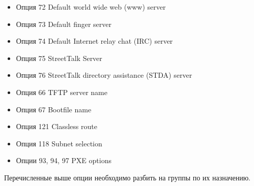 \documentclass[14pt,a4paper]{extarticle}
\begin{document}
\begin{itemize}
    \item Опция 72 Default world wide web (www) server
    \item Опция 73 Default finger server
    \item Опция 74 Default Internet relay chat (IRC) server
    \item Опция 75 StreetTalk Server
    \item Опция 76 StreetTalk directory assistance (STDA) server
    \item Опция 66 TFTP server name
    \item Опция 67 Bootfile name
    \item Опция 121 Classless route
    \item Опция 118 Subnet selection
    \item Опции 93, 94, 97 PXE options
\end{itemize}

Перечисленные выше опции необходимо разбить на группы по их назначению.
\end{document}
